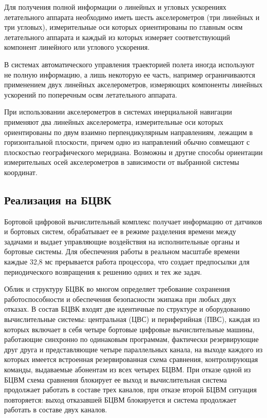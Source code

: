 Для получения полной информации о линейных и угловых ускорениях летательного аппарата необходимо иметь шесть акселерометров (три линейных и три угловых), измерительные оси которых ориентированы по главным осям летательного аппарата и каждый из которых измеряет соответствующий компонент линейного или углового ускорения.

В системах автоматического управления траекторией полета иногда используют не полную информацию, а лишь некоторую ее часть, например ограничиваются применением двух линейных акселерометров, измеряющих компоненты линейных ускорений по поперечным осям летательного аппарата.

При использовании акселерометров в системах инерциальной навигации применяют два линейных акселерометра, измерительные оси которых ориентированы по двум взаимно перпендикулярным направлениям, лежащим в горизонтальной плоскости, причем одно из направлений обычно совмещают с плоскостью географического меридиана. Возможны и другие способы ориентации измерительных осей акселерометров в зависимости от выбранной системы координат.
\clearpage

\subsection{Реализация на БЦВК}

Бортовой цифровой вычислительный комплекс получает информацию от датчиков и бортовых систем, обрабатывает ее в режиме разделения времени между задачами и выдает управляющие воздействия на исполнительные органы и бортовые системы. Для обеспечения работы в реальном масштабе времени каждые 32,8 мс прерывается работа процессора, что создает предпосылки для периодического возвращения к решению одних и тех же задач.

Облик и структуру БЦВК во многом определяет требование сохранения работоспособности и обеспечения безопасности экипажа при любых двух отказах. В состав БЦВК входят две идентичные по структуре и оборудованию вычислительные системы: центральная (ЦВС) и периферийная (ПВС), каждая из которых включает в себя четыре бортовые цифровые вычислительные машины, работающие синхронно по одинаковым программам, фактически резервирующие друг друга и представляющие четыре параллельных канала, на выходе каждого из которых имеется встроенная резервированная схема сравнения, контролирующая команды, выдаваемые абонентам из всех четырех БЦВМ. При отказе одной из БЦВМ схема сравнения блокирует ее выход и вычислительная система продолжает работать в составе трех каналов, при отказе второй БЦВМ ситуация повторяется: выход отказавшей БЦВМ блокируется и система продолжает работать в составе двух каналов.

